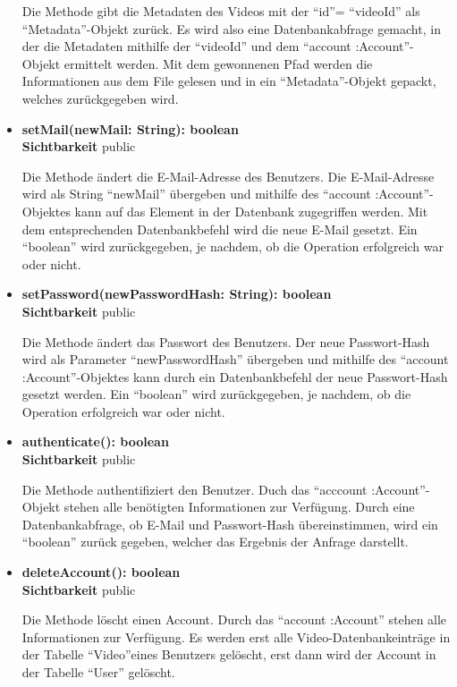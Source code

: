 \begin{itemize}
Die Methode gibt die Metadaten des Videos mit der ``id''= ``videoId'' als ``Metadata''-Objekt zurück. Es wird also eine Datenbankabfrage gemacht, in der die Metadaten mithilfe der ``videoId'' und dem ``account :Account''-Objekt ermittelt werden. Mit dem gewonnenen Pfad werden die Informationen aus dem File gelesen und in ein ``Metadata''-Objekt gepackt, welches zurückgegeben wird. 

\item \textbf{setMail(newMail: String): boolean}\hfill\\
\textbf{Sichtbarkeit} public

Die Methode ändert die E-Mail-Adresse des Benutzers. Die E-Mail-Adresse wird als String ``newMail'' übergeben und mithilfe des ``account :Account''-Objektes kann auf das Element in der Datenbank zugegriffen werden. Mit dem entsprechenden Datenbankbefehl wird die neue E-Mail gesetzt. Ein ``boolean'' wird zurückgegeben, je nachdem, ob die Operation erfolgreich war oder nicht.

\item \textbf{setPassword(newPasswordHash: String): boolean}\hfill\\
\textbf{Sichtbarkeit} public

Die Methode ändert das Passwort des Benutzers. Der neue Passwort-Hash wird als Parameter ``newPasswordHash'' übergeben und mithilfe des ``account :Account''-Objektes kann durch ein Datenbankbefehl der neue Passwort-Hash gesetzt werden. Ein ``boolean'' wird zurückgegeben, je nachdem, ob die Operation erfolgreich war oder nicht.

\item \textbf{authenticate(): boolean}\hfill\\
\textbf{Sichtbarkeit} public

Die Methode authentifiziert den Benutzer. Duch das ``acccount :Account''-Objekt stehen alle benötigten Informationen zur Verfügung. Durch eine Datenbankabfrage, ob E-Mail und Passwort-Hash übereinstimmen, wird ein ``boolean'' zurück gegeben, welcher das Ergebnis der Anfrage darstellt.

\item \textbf{deleteAccount(): boolean}\hfill\\
\textbf{Sichtbarkeit} public

Die Methode löscht einen Account. Durch das ``account :Account'' stehen alle Informationen zur Verfügung. Es werden erst alle Video-Datenbankeinträge in der Tabelle ``Video''eines Benutzers gelöscht, erst dann wird der Account in der Tabelle ``User'' gelöscht.


\end{itemize}
